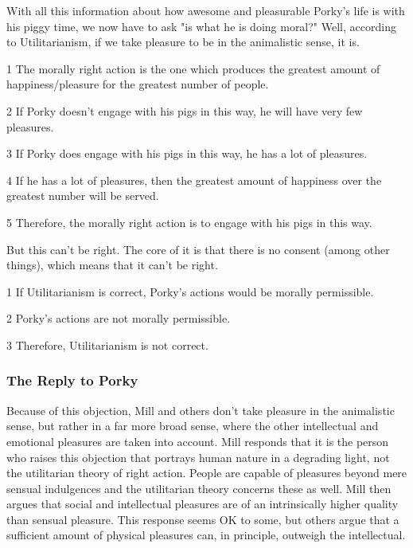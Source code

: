 With all this information about how awesome and pleasurable Porky's life is with his piggy time, we now have to ask "is what he is doing moral?" Well, according to Utilitarianism, if we take pleasure to be in the animalistic sense, it is.
\begin{earg}
    \item[1] The morally right action is the one which produces the greatest amount of happiness/pleasure for the greatest number of people.
    \item[2] If Porky doesn’t engage with his pigs in this way, he will have very few pleasures.
    \item[3] If Porky does engage with his pigs in this way, he has a lot of pleasures.
    \item[4] If he has a lot of pleasures, then the greatest amount of happiness over the greatest number will be served.
    \item[5] Therefore, the morally right action is to engage with his pigs in this way.
\end{earg}
But this can't be right. The core of it is that there is no consent (among other things), which means that it can't be right.
\begin{earg}
    \item[1] If Utilitarianism is correct, Porky’s actions would be morally permissible.
    \item[2] Porky’s actions are not morally permissible.
    \item[3] Therefore, Utilitarianism is not correct.
\end{earg}
\subsubsection{The Reply to Porky}

Because of this objection, Mill and others don't take pleasure in the animalistic sense, but rather in a far more broad sense, where the other intellectual and emotional pleasures are taken into account. Mill responds that it is the person who raises this objection that portrays human nature in a degrading light, not the utilitarian theory of right action. People are capable of pleasures beyond mere sensual indulgences and the utilitarian theory concerns these as well. Mill then argues that social and intellectual pleasures are of an intrinsically higher quality than sensual pleasure. This response seems OK to some, but others argue that a sufficient amount of physical pleasures can, in principle, outweigh the intellectual. 

